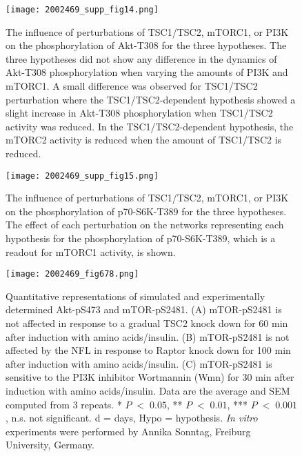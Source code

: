 \begin{figure}[tb]
	\begin{center}
		\texttt{[image: 2002469\_supp\_fig14.png]}
		\caption[The influence of perturbations of TSC1/TSC2, mTORC1, or PI3K on the phosphorylation of Akt-T308 for the three hypotheses]{The influence of perturbations of TSC1/TSC2, mTORC1, or PI3K on the phosphorylation of Akt-T308 for the three hypotheses. The three hypotheses did not show any difference in the dynamics of Akt-T308 phosphorylation when varying the amounts of PI3K and mTORC1. A small difference was observed for TSC1/TSC2 perturbation where the TSC1/TSC2-dependent hypothesis showed a slight increase in Akt-T308 phosphorylation when TSC1/TSC2 activity was reduced. In the TSC1/TSC2-dependent hypothesis, the mTORC2 activity is reduced when the amount of TSC1/TSC2 is reduced.}
		\label{fig:2002469_supp_fig14}
	\end{center}
\end{figure}
\clearpage

\begin{figure}[tb]
	\begin{center}
		\texttt{[image: 2002469\_supp\_fig15.png]}
		\caption[The influence of perturbations of TSC1/TSC2, mTORC1, or PI3K on the phosphorylation of p70-S6K-T389 for the three hypotheses]{The influence of perturbations of TSC1/TSC2, mTORC1, or PI3K on the phosphorylation of p70-S6K-T389 for the three hypotheses. The effect of each perturbation on the networks representing each hypothesis for the phosphorylation of p70-S6K-T389, which is a readout for mTORC1 activity, is shown.}
		\label{fig:2002469_supp_fig15}
	\end{center}
\end{figure}
\clearpage

\begin{figure}[tb]
	\begin{center}
		\texttt{[image: 2002469\_fig678.png]}
		\caption[Quantitative representations of simulated and experimentally determined Akt-pS473 and mTOR-pS2481]{Quantitative representations of simulated and experimentally determined Akt-pS473 and mTOR-pS2481. 
		(A) mTOR-pS2481 is not affected in response to a gradual TSC2 knock down for 60 min after induction with amino acids/insulin. 
		(B) mTOR-pS2481 is not affected by the NFL in response to Raptor knock down for 100 min after induction with amino acids/insulin. 
		(C) mTOR-pS2481 is sensitive to the PI3K inhibitor Wortmannin (Wmn) for 30 min after induction with amino acids/insulin. Data are the average and SEM computed from 3 repeats. * $P\;<\;0.05$, ** $P\;<\;0.01$, *** $P\;<\;0.001$, n.s. not significant. d = days, Hypo = hypothesis. \emph{In vitro} experiments were performed by Annika Sonntag, Freiburg University, Germany.}
		\label{fig:2002469_fig678}
	\end{center}
\end{figure}
\clearpage

